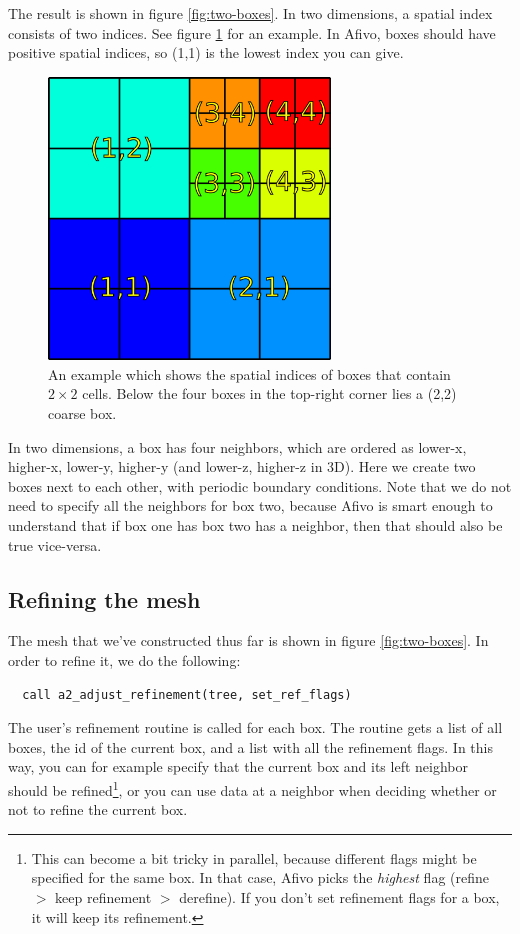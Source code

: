 \documentclass[a4paper, a4wide]{article}
\begin{document}
The result is shown in figure \ref{fig:two-boxes}.
In two dimensions, a spatial index consists of two indices.
See figure \ref{fig:box-indices} for an example.
In Afivo, boxes should have positive spatial indices, so (1,1) is the lowest
index you can give.

\begin{figure}
  \centering
  \includegraphics[width=7.5cm]{figures/box_indices.png}
  \caption{An example which shows the spatial indices of boxes that contain
    $2 \times 2$ cells.
    Below the four boxes in the top-right corner lies a (2,2) coarse box.}
  \label{fig:box-indices}
\end{figure}

In two dimensions, a box has four neighbors, which are ordered as lower-x,
higher-x, lower-y, higher-y (and lower-z, higher-z in 3D).
Here we create two boxes next to each other, with periodic boundary conditions.
Note that we do not need to specify all the neighbors for box two, because Afivo
is smart enough to understand that if box one has box two has a neighbor, then
that should also be true vice-versa.

\subsection{Refining the mesh}
\label{sec:refining-mesh}

The mesh that we've constructed thus far is shown in figure \ref{fig:two-boxes}.
In order to refine it, we do the following:
\begin{lstlisting}
  call a2_adjust_refinement(tree, set_ref_flags)
\end{lstlisting}

The user's refinement routine is called for each box.
The routine gets a list of all boxes, the id of the current box, and a list with
all the refinement flags.
In this way, you can for example specify that the current box and its left
neighbor should be refined\footnote{This can become a bit tricky in parallel,
  because different flags might be specified for the same box.
  In that case, Afivo picks the \emph{highest} flag (refine $>$ keep refinement
  $>$ derefine).
  If you don't set refinement flags for a box, it will keep its refinement.}, or
you can use data at a neighbor when deciding whether or not to refine the
current box.
\end{document}
